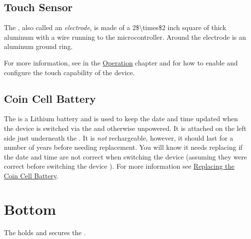 \section{Touch Sensor} \label{Touch Sensor}

The , also called an \textit{electrode}, is made of a \num{2$\times$2}
inch square of  thick aluminum with a wire running to the
microcontroller.  Around the electrode is an aluminum ground ring.

\par\medskip

For more information, see \hyperref[Operation - Touch Sensor]{} in the
\hyperref[Operation]{Operation} chapter and \hyperref[Touch Settings]{}
for how to enable and configure the touch capability of the device.

\section{Coin Cell Battery} \label{Coin Cell Battery}

The  is a   Lithium battery and is used
to keep the date and time updated when the device is switched  via the
\hyperref[Power Switch]{} and otherwise unpowered.  It is attached on the
left side just underneath the .  It is \textit{not} rechargeable,
however, it should last for a number of years before needing replacement.  You
will know it needs replacing if the date and time are not correct when switching
the device  (assuming they were correct before switching the device
).  For more information see
\hyperref[Replacing Battery]{Replacing the Coin Cell Battery}.

\chapter{Bottom} \label{Bottom}

The  holds and secures the .

